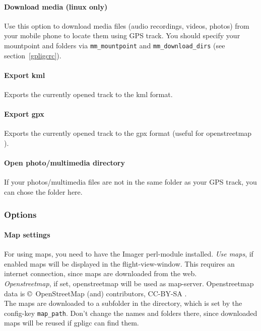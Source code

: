 \paragraph{Download media (linux only)}
Use this option to download media files (audio recordings, videos, photos) from your mobile phone to locate them using GPS track.
You should specify your mountpoint and folders via \texttt{mm\_mountpoint} and \texttt{mm\_download\_dirs} (see section~\ref{gpligcrc}).

\paragraph{Export kml}
Exports the currently opened track to the kml format.

\paragraph{Export gpx}
Exports the currently opened track to the gpx format (useful for openstreetmap \cite{osm}).

\paragraph{Open photo/multimedia directory}
If your photos/multimedia files are not in the same folder as your GPS track, you can chose the folder here.



\subsubsection{Options}

\paragraph{Map settings}
For using maps, you need to have the Imager perl-module installed.
\emph{Use maps}, if enabled maps will be displayed in the flight-view-window.
This requires an internet connection, since maps are downloaded from the web.\\
\emph{Openstreetmap}, if set, openstreetmap will be used as map-server.
Openstreetmap data is \copyright\ OpenStreetMap (and) contributors, CC-BY-SA \cite{osm}.\\

The maps are downloaded to a subfolder in the directory, which is set by the config-key \texttt{map\_path}.
Don't change the names and folders there, since downloaded maps will be reused if gpligc can find them.

